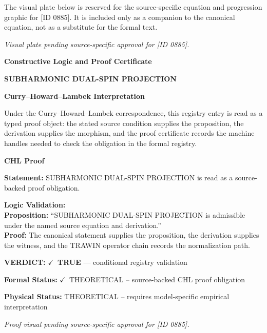 \begingroup\footnotesize\sloppy
The visual plate below is reserved for the source-specific equation and progression graphic for [ID 0885]. It is included only as a companion to the canonical equation, not as a substitute for the formal text.
\par\endgroup
\begingroup\footnotesize\itshape
Visual plate pending source-specific approval for [ID 0885].
\par\endgroup

\clearpage
\begingroup\tzpsupportsetup
\noindent\textbf{\fontsize{10.8pt}{12.8pt}\selectfont [ID 0885] Constructive Logic and Proof Certificate}\par
\noindent\textbf{\fontsize{10pt}{12pt}\selectfont SUBHARMONIC DUAL-SPIN PROJECTION}\par
\vspace{0.45em}
\begingroup
\footnotesize
\setlength{\parskip}{0.22em}
\setlength{\parindent}{0pt}
\noindent\textbf{Curry--Howard--Lambek Interpretation}\par
Under the Curry--Howard--Lambek correspondence, this registry entry is read as a typed proof
object: the stated source condition supplies the proposition, the derivation supplies the
morphism, and the proof certificate records the machine handles needed to check the obligation
in the formal registry.

\vspace{0.45em}
\noindent\textbf{CHL Proof}\par
\textbf{Statement:} SUBHARMONIC DUAL-SPIN PROJECTION is read as a source-backed proof obligation.

\textbf{Logic Validation:}\\
\textbf{Proposition:} ``SUBHARMONIC DUAL-SPIN PROJECTION is admissible under the named source equation and derivation.''\\
\textbf{Proof:} The canonical statement supplies the proposition, the derivation supplies the witness, and the TRAWIN operator chain records the normalization path.

\textbf{VERDICT:} \ensuremath{\checkmark}\ \textbf{TRUE} --- conditional registry validation

\textbf{Formal Status:} \ensuremath{\checkmark}\ THEORETICAL -- source-backed CHL proof obligation

\textbf{Physical Status:} THEORETICAL -- requires model-specific empirical interpretation
\par\vspace{0.45em}
\par
\vfill
\begingroup\footnotesize\itshape
Proof visual pending source-specific approval for [ID 0885].
\par\endgroup
\vfill
\endgroup
\endgroup
